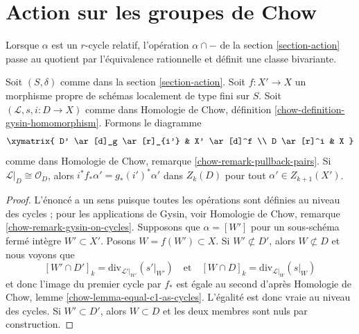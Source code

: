 






\section{Action sur les groupes de Chow} 
\label{section-action-chow} 

\noindent
 Lorsque $\alpha$ est un $r$-cycle relatif, l'opération $\alpha \cap -$
 de la section \ref{section-action} passe au quotient par l'équivalence rationnelle
 et définit une classe bivariante. 

\begin{lemma} 
\label{lemma-closed-in-X-gysin} 
Soit $(S, \delta)$ comme dans la section \ref{section-action}. 
Soit $f : X' \to X$ un morphisme propre de schémas 
localement de type fini sur $S$.
 Soit $(\mathcal{L}, s, i : D \to X)$ comme dans
 Homologie de Chow, définition \ref{chow-definition-gysin-homomorphism}. 
Formons le diagramme 
$$
\xymatrix{
D' \ar[d]_g \ar[r]_{i'} & X' \ar[d]^f \\
D \ar[r]^i & X
}
$$
 comme dans Homologie de Chow, remarque \ref{chow-remark-pullback-pairs}. 
Si $\mathcal{L}|_D \cong \mathcal{O}_D$, alors 
$i^*f_*\alpha' = g_*(i')^*\alpha'$ dans $Z_k(D)$
 pour tout $\alpha' \in Z_{k + 1}(X')$. 
\end{lemma} 

\begin{proof} 
L'énoncé a un sens puisque toutes les opérations sont définies au niveau des cycles ; pour les 
applications de Gysin, voir Homologie de Chow, remarque \ref{chow-remark-gysin-on-cycles}.
 Supposons
 que $\alpha = [W']$ pour un sous-schéma fermé intègre 
$W' \subset X'$. Posons $W = f(W') \subset X$. Si $W' \not \subset D'$,
 alors $W \not \subset D$ et nous voyons que 
$$
[W' \cap D']_k = \text{div}_{\mathcal{L}'|_{W'}}({s'|_{W'}})
\quad\text{et}\quad
[W \cap D]_k = \text{div}_{\mathcal{L}|_W}(s|_W)
$$
 et donc l'image du premier cycle par $f_*$ est égale au second d'après Homologie
 de Chow, lemme \ref{chow-lemma-equal-c1-as-cycles}. L'égalité est
 donc vraie au niveau des cycles. Si $W' \subset D'$, alors 
$W \subset D$ et les deux membres sont nuls par construction. 
\end{proof} 

